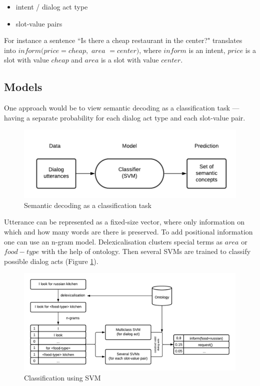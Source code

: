 \documentclass[12pt,titlepage,a4paper]{article}
\begin{document}
\begin{itemize}
    \item intent / dialog act type
    \item slot-value pairs
\end{itemize}

For instance a sentence ``Is there a cheap restaurant in the center?" translates into $inform(price=cheap,$ $area$ $=center)$, where $inform$ is an intent, $price$ is a slot with value $cheap$ and $area$ is a slot with value $center$.

\subsection{Models}
One approach would be to view semantic decoding as a classification task --- having a sepa\-rate probabi\-lity for each dialog act type and each slot-value pair.

\begin{figure}[h!]
    \centering
    \includegraphics[width=0.8\linewidth]{training-2.png}
    \caption{Semantic decoding as a classification task}
\end{figure}

Utterance can be represented as a fixed-size vector, where only informa\-tion on which and how many words are there is preserved. To add positional information one can use an n-gram model. Delexicalisation clusters special terms as $area$ or $food-type$ with the help of ontology. Then several SVMs are trained to classify possible dialog acts (Figure \ref{fig:semantic-decoding-classification}).

\begin{figure}[h!]
    \includegraphics[width=0.998\textwidth]{semantic-decoding-classification.png}
    \caption{Classification using SVM}
    \label{fig:semantic-decoding-classification}
\end{figure}
\end{document}
